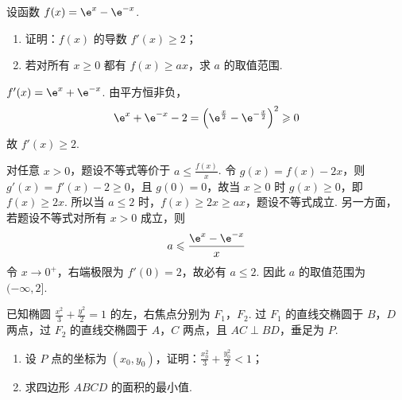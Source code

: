 \begin{problem}
设函数 \(f(x) = \e^{x} - \e^{-x}\).

\begin{enumerate}
\item 证明：\(f(x)\) 的导数 \(f'(x) \geqslant 2\)；
\item 若对所有 \(x \geqslant 0\) 都有 \(f(x) \geqslant ax\)，求 \(a\) 的取值范围.
\end{enumerate}
\end{problem}

\begin{solution}
\(f'(x)=\e^x+\e^{-x}\). 由平方恒非负，
\[
\e^x+\e^{-x}-2=\left(\e^{\frac{x}{2}}-\e^{-\frac{x}{2}}\right)^2\geqslant0
\]
故 \(f'(x)\geqslant2\).

对任意 \(x>0\)，题设不等式等价于 \(a\leqslant\frac{f(x)}x\). 令 \(g(x)=f(x)-2x\)，则 \(g'(x)=f'(x)-2\geqslant0\)，且 \(g(0)=0\)，故当 \(x\geqslant0\) 时 \(g(x)\geqslant0\)，即 \(f(x)\geqslant2x\). 所以当 \(a\leqslant2\) 时，\(f(x)\geqslant2x\geqslant ax\)，题设不等式成立. 另一方面，若题设不等式对所有 \(x>0\) 成立，则
\[
a\leqslant\frac{\e^x-\e^{-x}}x
\]
令 \(x\to0^+\)，右端极限为 \(f'(0)=2\)，故必有 \(a\leqslant2\). 因此 \(a\) 的取值范围为 \((-\infty,2]\).
\end{solution}

\begin{problem}
已知椭圆 \(\frac{x^{2}}{3} + \frac{y^{2}}{2} = 1\) 的左，右焦点分别为 \(F_1\)，\(F_2\). 过 \(F_1\) 的直线交椭圆于 \(B\)，\(D\) 两点，过 \(F_2\) 的直线交椭圆于 \(A\)，\(C\) 两点，且 \(AC \perp BD\)，垂足为 \(P\).

\begin{enumerate}
\item 设 \(P\) 点的坐标为 \((x_0, y_0)\)，证明：\(\frac{x_0^{2}}{3} + \frac{y_0^{2}}{2} < 1\)；
\item 求四边形 \(ABCD\) 的面积的最小值.
\end{enumerate}
\end{problem}

